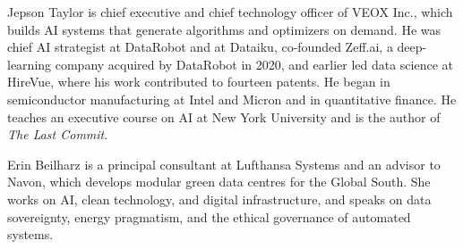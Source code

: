 \documentclass[10pt,journal,twoside]{IEEEtran}
\theoremstyle{plain}
\theoremstyle{remark}
\begin{document}
\begin{IEEEbiographynophoto}{Jepson Taylor}
is chief executive and chief technology officer of VEOX Inc., which builds AI systems that generate algorithms and optimizers on demand. He was chief AI strategist at DataRobot and at Dataiku, co-founded Zeff.ai, a deep-learning company acquired by DataRobot in 2020, and earlier led data science at HireVue, where his work contributed to fourteen patents. He began in semiconductor manufacturing at Intel and Micron and in quantitative finance. He teaches an executive course on AI at New York University and is the author of \emph{The Last Commit}.
\end{IEEEbiographynophoto}

\begin{IEEEbiographynophoto}{Erin Beilharz}
is a principal consultant at Lufthansa Systems and an advisor to Navon, which develops modular green data centres for the Global South. She works on AI, clean technology, and digital infrastructure, and speaks on data sovereignty, energy pragmatism, and the ethical governance of automated systems.
\end{IEEEbiographynophoto}
\vfill

\clearpage

\end{document}
